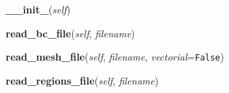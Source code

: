 \hspace{.8\funcindent}\begin{boxedminipage}{\funcwidth}

    \raggedright \textbf{\_\_init\_}(\textit{self})

\setlength{\parskip}{2ex}
\setlength{\parskip}{1ex}
    \end{boxedminipage}

    \label{Classes:Domain:read_bc_file}

    \vspace{0.5ex}

\hspace{.8\funcindent}\begin{boxedminipage}{\funcwidth}

    \raggedright \textbf{read\_bc\_file}(\textit{self}, \textit{filename})

\setlength{\parskip}{2ex}
\setlength{\parskip}{1ex}
    \end{boxedminipage}

    \label{Classes:Domain:read_mesh_file}

    \vspace{0.5ex}

\hspace{.8\funcindent}\begin{boxedminipage}{\funcwidth}

    \raggedright \textbf{read\_mesh\_file}(\textit{self}, \textit{filename}, \textit{vectorial}={\tt False})

\setlength{\parskip}{2ex}
\setlength{\parskip}{1ex}
    \end{boxedminipage}

    \label{Classes:Domain:read_regions_file}

    \vspace{0.5ex}

\hspace{.8\funcindent}\begin{boxedminipage}{\funcwidth}

    \raggedright \textbf{read\_regions\_file}(\textit{self}, \textit{filename})

\setlength{\parskip}{2ex}
\setlength{\parskip}{1ex}
    \end{boxedminipage}

